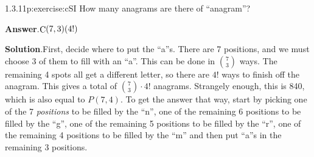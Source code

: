 \documentclass[twoside,11pt,]{book}
\newcommand{\blocktitlefont}{\relax}
\numberwithin{equation}{chapter}
\begin{document}
\begin{divisionsolution}{1.3.11}{}{p:exercise:cSI}%
How many anagrams are there of ``anagram''?%
\par\smallskip%
\noindent\textbf{\blocktitlefont Answer}.\quad{}\(\mathop{\rm C}\nolimits\!\left(7,3\right)\!\left(4!\right)\)%
\par\smallskip%
\noindent\textbf{\blocktitlefont Solution}.\quad{}First, decide where to put the ``a''s. There are 7 positions, and we must choose 3 of them to fill with an ``a''. This can be done in \({7 \choose 3}\) ways. The remaining 4 spots all get a different letter, so there are \(4!\) ways to finish off the anagram. This gives a total of \({7 \choose 3}\cdot 4!\) anagrams. Strangely enough, this is 840, which is also equal to \(P(7,4)\text{.}\) To get the answer that way, start by picking one of the 7 \emph{positions} to be filled by the ``n'', one of the remaining 6 positions to be filled by the ``g'', one of the remaining 5 positions to be filled by the ``r'', one of the remaining 4 positions to be filled by the ``m'' and then put ``a''s in the remaining 3 positions.%
\end{divisionsolution}%
\end{document}
